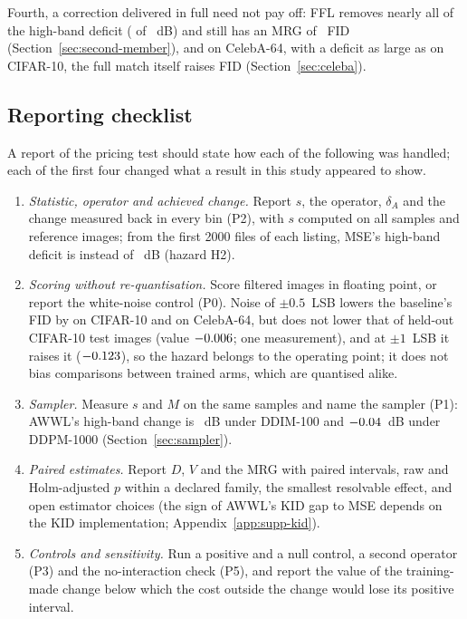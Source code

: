 Fourth, a correction delivered in full need not pay off: FFL removes nearly
all of the high-band deficit (\corrHighFFL{} of ~dB) and still
has an MRG of \mrgArmFFL~FID (Section~\ref{sec:second-member}), and on
CelebA-64, with a deficit as large as on CIFAR-10, the full match itself
raises FID (Section~\ref{sec:celeba}).

\subsection{Reporting checklist}
\label{sec:discussion-hygiene}

A report of the pricing test should state how each of the following was
handled; each of the first four changed what a result in this study appeared
to show.
\begin{enumerate}
  \item \emph{Statistic, operator and achieved change.} Report $s$, the
    operator, $\delta_A$ and the change measured back in every bin (P2),
    with $s$ computed on all samples and reference images; from the first
    \num{2000} files of each listing, MSE's high-band deficit is
     instead of ~dB (hazard H2).
  \item \emph{Scoring without re-quantisation.} Score filtered images in
    floating point, or report the white-noise control (P0). Noise of
    $\pm0.5$~LSB lowers the baseline's FID by \priceNoiseHalfValue{} on
    CIFAR-10 and \celebaNoiseHalfValue{} on CelebA-64, but does not lower
    that of held-out CIFAR-10 test images (value $-0.006$; one
    measurement), and at $\pm1$~LSB it raises it ($-0.123$), so
    the hazard belongs to the operating point; it does not bias comparisons
    between trained arms, which are quantised alike.
  \item \emph{Sampler.} Measure $s$ and $M$ on the same samples and name the
    sampler (P1): AWWL's high-band change is \corrHighAWWL~dB under DDIM-100
    and $-0.04$~dB under DDPM-1000 (Section~\ref{sec:sampler}).
  \item \emph{Paired estimates.} Report $D$, $V$ and the MRG with paired
    intervals, raw and Holm-adjusted $p$ within a declared family, the
    smallest resolvable effect, and open estimator choices (the sign of
    AWWL's KID gap to MSE depends on the KID implementation;
    Appendix~\ref{app:supp-kid}).
  \item \emph{Controls and sensitivity.} Run a positive and a null control, a
    second operator (P3) and the no-interaction check (P5), and report the
    value of the training-made change below which the cost outside the change
    would lose its positive interval.
\end{enumerate}

